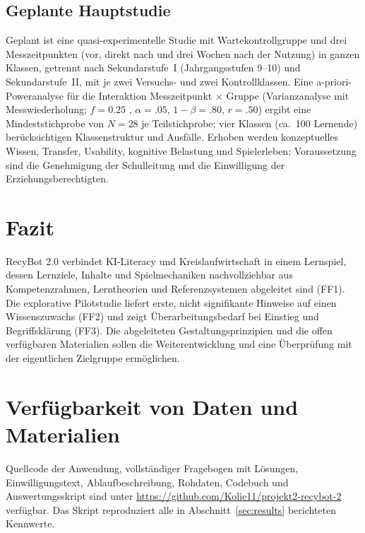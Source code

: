 \documentclass[sigconf,nonacm]{acmart}
\newcommand{\repourl}{\url{https://github.com/Kolie11/projekt2-recybot-2}}
\begin{document}
\subsection{Geplante Hauptstudie}
Geplant ist eine quasi-experimentelle Studie mit Wartekontrollgruppe und drei Messzeitpunkten (vor, direkt nach und drei Wochen nach der Nutzung) in ganzen Klassen, getrennt nach Sekundarstufe~I (Jahrgangsstufen 9--10) und Sekundarstufe~II, mit je zwei Versuchs- und zwei Kontrollklassen. Eine a-priori-Poweranalyse für die Interaktion Messzeitpunkt $\times$ Gruppe (Varianzanalyse mit Messwiederholung; $f = 0.25$ \cite{cohen1988}, $\alpha = .05$, $1-\beta = .80$, $r = .50$) ergibt eine Mindeststichprobe von $N = 28$ je Teilstichprobe; vier Klassen (ca.\ 100 Lernende) berücksichtigen Klassenstruktur und Ausfälle. Erhoben werden konzeptuelles Wissen, Transfer, Usability, kognitive Belastung \cite{klepsch2017} und Spielerleben; Voraussetzung sind die Genehmigung der Schulleitung und die Einwilligung der Erziehungsberechtigten.

\section{Fazit}
RecyBot 2.0 verbindet KI-Literacy und Kreislaufwirtschaft in einem Lernspiel, dessen Lernziele, Inhalte und Spielmechaniken nachvollziehbar aus Kompetenzrahmen, Lerntheorien und Referenzsystemen abgeleitet sind (FF1). Die explorative Pilotstudie liefert erste, nicht signifikante Hinweise auf einen Wissenszuwachs (FF2) und zeigt Überarbeitungsbedarf bei Einstieg und Begriffsklärung (FF3). Die abgeleiteten Gestaltungsprinzipien und die offen verfügbaren Materialien sollen die Weiterentwicklung und eine Überprüfung mit der eigentlichen Zielgruppe ermöglichen.

\section*{Verfügbarkeit von Daten und Materialien}
Quellcode der Anwendung, vollständiger Fragebogen mit Lösungen, Einwilligungstext, Ablaufbeschreibung, Rohdaten, Codebuch und Auswertungsskript sind unter \repourl{} verfügbar. Das Skript reproduziert alle in Abschnitt~\ref{sec:results} berichteten Kennwerte.
\end{document}
